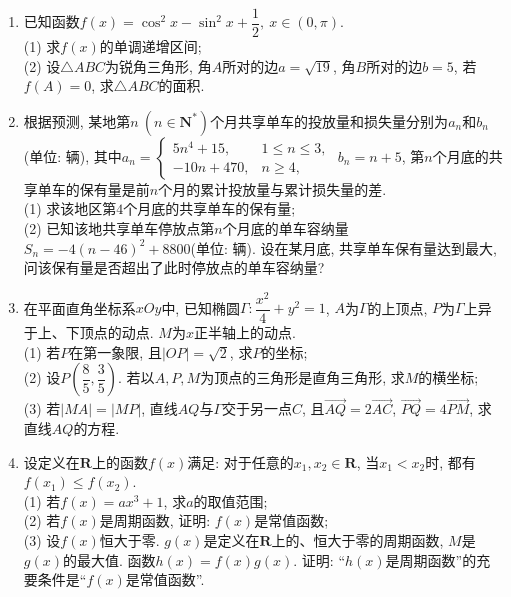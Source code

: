 \documentclass[10pt,a4paper]{article}
\begin{document}
\begin{enumerate}[1.]
\item 已知函数$f(x)=\cos^2 x-\sin^2 x+\dfrac{1}{2}, \ x\in (0,\pi)$.\\
(1) 求$f(x)$的单调递增区间;\\
(2) 设$\triangle ABC$为锐角三角形, 角$A$所对的边$a=\sqrt{19}$, 角$B$所对的边$b=5$, 若$f(A)=0$, 求$\triangle ABC$的面积.
\item 根据预测, 某地第$n \ (n\in \mathbf{N}^*)$个月共享单车的投放量和损失量分别为$a_n$和$b_n$(单位: 辆), 其中$a_n=\begin{cases}
5n^4+15, & 1\le n\le 3,\\ -10n+470, & n \ge 4,
\end{cases}$ $b_n=n+5$, 第$n$个月底的共享单车的保有量是前$n$个月的累计投放量与累计损失量的差.\\
(1) 求该地区第$4$个月底的共享单车的保有量;\\
(2) 已知该地共享单车停放点第$n$个月底的单车容纳量$S_n=-4(n-46)^2+8800$(单位: 辆). 设在某月底, 共享单车保有量达到最大, 问该保有量是否超出了此时停放点的单车容纳量?
\item 在平面直角坐标系$xOy$中, 已知椭圆$\Gamma: \dfrac{x^2}{4}+y^2=1$, $A$为$\Gamma$的上顶点, $P$为$\Gamma$上异于上、下顶点的动点. $M$为$x$正半轴上的动点.\\
(1) 若$P$在第一象限, 且$|OP|=\sqrt{2}$, 求$P$的坐标;\\
(2) 设$P\left(\dfrac{8}{5},\dfrac{3}{5}\right)$. 若以$A,P,M$为顶点的三角形是直角三角形, 求$M$的横坐标;\\
(3) 若$|MA|=|MP|$, 直线$AQ$与$\Gamma$交于另一点$C$, 且$\overrightarrow{AQ}=2\overrightarrow{AC}$, $\overrightarrow{PQ}=4\overrightarrow{PM}$, 求直线$AQ$的方程.
\item 设定义在$\mathbf{R}$上的函数$f(x)$满足: 对于任意的$x_1,x_2\in \mathbf{R}$, 当$x_1<x_2$时, 都有$f(x_1)\le f(x_2)$.\\
(1) 若$f(x)=ax^3+1$, 求$a$的取值范围;\\
(2) 若$f(x)$是周期函数, 证明: $f(x)$是常值函数;\\
(3) 设$f(x)$恒大于零. $g(x)$是定义在$\mathbf{R}$上的、恒大于零的周期函数, $M$是$g(x)$的最大值. 函数$h(x)=f(x)g(x)$. 证明: ``$h(x)$是周期函数''的充要条件是``$f(x)$是常值函数''.
\end{enumerate}
\end{document}
